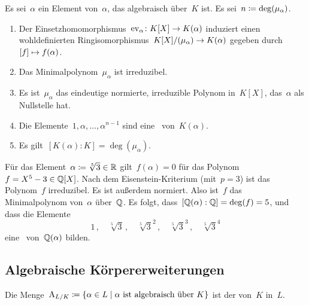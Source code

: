 \begin{proposition}
  Es sei~$\alpha$ ein Element von~$\alpha$, das algebraisch über~$K$ ist.
  Es sei~$n \coloneqq \deg(\mu_\alpha)$.
  \begin{enumerate}
    \item
      Der Einsetzhomomorphismus~$\ev_\alpha \colon K[X] \to K(\alpha)$ induziert einen wohldefinierten Ringisomorphismus~$K[X] / \genideal{\mu_\alpha} \to K(\alpha)$ gegeben durch~$\class{f} \mapsto f(\alpha)$.
    \item
      Das Minimalpolynom~$\mu_\alpha$ ist irreduzibel.
    \item
      Es ist~$\mu_\alpha$ das eindeutige normierte, irreduzible Polynom in~$K[X]$, das~$\alpha$ als Nullstelle hat.
    \item
      Die Elemente~$1, \alpha, \dotsc, \alpha^{n-1}$ sind eine~ von~$K(\alpha)$.
    \item
      Es gilt~$[K(\alpha) : K] = \deg(\mu_\alpha)$.
  \end{enumerate}
\end{proposition}

\begin{example}
  Für das Element~$\alpha \coloneqq \sqrt[5]{3} \in \mathbb{R}$ gilt~$f(\alpha) = 0$ für das Polynom~$f = X^5 - 3 \in \mathbb{Q}[X]$.
  Nach dem Eisenstein-Kriterium (mit~$p = 3$) ist das Polynom~$f$ irreduzibel.
  Es ist außerdem normiert.
  Also ist~$f$ das Minimalpolynom von~$\alpha$ über~$\Rational$.
  Es folgt, dass~$[\mathbb{Q}(\alpha) : \mathbb{Q}] = \deg(f) = 5$, und dass die Elemente
  \[
    1 \,,
    \quad
    \sqrt[5]{3} \,,
    \quad
    \sqrt[5]{3}^2 \,,
    \quad
    \sqrt[5]{3}^3 \,,
    \quad
    \sqrt[5]{3}^4
  \]
  eine~\Basis{$\Rational$} von~$\mathbb{Q}(\alpha)$ bilden.
\end{example}




\clearpage





\subsection{Algebraische Körpererweiterungen}

\begin{definition}
  Die Menge~$\Alg_{L/K} \defined \{ \alpha \in L \suchthat \text{$\alpha$ ist algebraisch über~$K$} \}$ ist der  von~$K$ in~$L$.
\end{definition}

